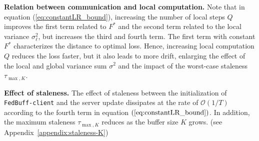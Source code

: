\documentclass[twoside]{article}
\newcommand{\order}[1]{\mathcal{O}\left(#1\right)}
\begin{document}
\textbf{Relation between communication and local computation. } Note that in equation (\ref{eq:constantLR_bound}), increasing the number of local steps $Q$ improves the first term related to $F^*$ and the second term related to the local variance $\sigma^2_{\ell}$, but increases the third and fourth term. The first term with constant $F^*$ characterizes the distance to optimal loss. Hence, increasing local computation $Q$ reduces the loss faster, but it also leads to more drift, enlarging the effect of the local and global variance sum $\sigma^2$ and the impact of the worst-case staleness $\tau_{\max, K}$. 



\textbf{Effect of staleness.} The effect of staleness between the initialization of \texttt{FedBuff-client} and the server update dissipates at the rate of $\order{1/T}$ according to the fourth term in equation $(\ref{eq:constantLR_bound})$. In addition, the maximum staleness $\tau_{\max, K}$ reduces as the buffer size $K$ grows. (see Appendix~\ref{appendix:staleness-K})



\end{document}

